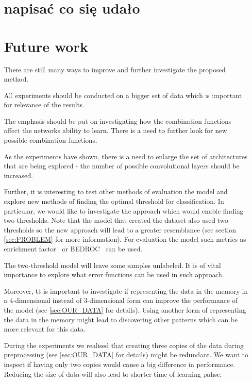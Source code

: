 \documentclass[a4paper,10pt]{report}
\begin{document}
    \section{napisać co się udało}
    \section{Future work}
      There are still many ways to improve and further investigate the proposed method.
      
      All experiments should be conducted on a bigger set of data which is important for relevance of the results.
      
      The emphasis should be put on investigating how the combination functions affect the networks ability to learn. There is a need to further look for new possible combination functions.
      
      As the experiments have shown, there is a need to enlarge the set of architectures that are being explored - the number of possible convolutional layers should be increased.
      
      Further, it is interesting to test other methods of evaluation the model and explore new methods of finding the optimal threshold for classification. In particular, we would like to investigate the approach which would enable finding two thresholds. Note that the model that created the dataset also used two thresholds so the new approach will lead to a greater resemblance (see section \ref{sec:PROBLEM} for more information). For evaluation the model such metrics as enrichment factor~\cite{ROC_EF, EF_BEDROC} or BEDROC~\cite{EF_BEDROC} can be used.
      
      The two-threshold model will leave some samples unlabeled. It is of vital importance to explore what error functions can be used in such approach.

      Moreover, tt is important to investigate if representing the data in the memory in a 4-dimensional instead of 3-dimensional form can improve the performance of the model (see \ref{sec:OUR_DATA} for details). Using another form of representing the data in the memory might lead to discovering other patterns which can be more relevant for this data.
      
      During the experiments we realised that creating three copies of the data during preprocessing (see \ref{sec:OUR_DATA} for details) might be redundant. We want to inspect if having only two copies would cause a big difference in performance. Reducing the size of data will also lead to shorter time of learning pahse.
      
\end{document}
